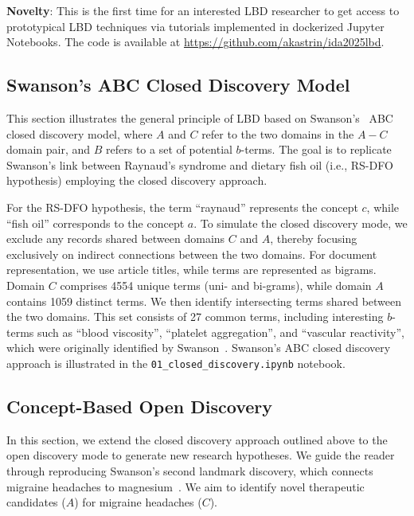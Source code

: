 \documentclass[runningheads]{llncs}
\begin{document}
\begin{tcolorbox}[breakable,notitle,sharp corners,boxrule=0.5pt,boxsep=0pt,left=5pt,right=5pt,top=5pt,bottom=5pt,before skip=0pt,after skip=0pt]
\textbf{Novelty}: This is the first time for an interested LBD researcher to get access to prototypical LBD techniques via tutorials implemented in dockerized Jupyter Notebooks. 
The code is available at \url{https://github.com/akastrin/ida2025lbd}.
\end{tcolorbox}

\subsection{Swanson's ABC Closed Discovery Model}
\label{sec:abc_model}

This section illustrates the general principle of LBD based on Swanson's~\cite{swanson1986fish} ABC closed discovery model, where $A$ and $C$ refer to the two domains in the $A{-}C$ domain pair, and $B$ refers to a set of potential $b$-terms. The goal is to replicate Swanson's link between Raynaud's syndrome and dietary fish oil (i.e., RS-DFO hypothesis) employing the closed discovery approach. 

For the RS-DFO hypothesis, the term ``raynaud'' represents the concept $c$, while ``fish oil'' corresponds to the concept $a$. To simulate the closed discovery mode, we exclude any records shared between domains $C$ and $A$, thereby focusing exclusively on indirect connections between the two domains. For document representation, we use article titles, while terms are represented as bigrams. Domain $C$ comprises 4554 unique terms (uni- and bi-grams), while domain $A$ contains 1059 distinct terms. We then identify intersecting terms shared between the two domains. This set consists of 27 common terms, including interesting $b$-terms such as ``blood viscosity'', ``platelet aggregation'', and ``vascular reactivity'', which were originally identified by Swanson~\cite{swanson1986fish}. Swanson's ABC closed discovery approach is illustrated in the \texttt{01\_closed\_dis\-cov\-ery.ipynb} notebook.

\subsection{Concept-Based Open Discovery}
\label{sec:open_discovery}

In this section, we extend the closed discovery approach outlined above to the open discovery mode to generate new research hypotheses. We guide the reader through reproducing Swanson's second landmark discovery, which connects migraine headaches to magnesium~\cite{swanson1988migraine}.  We aim to identify novel therapeutic candidates ($A$) for migraine headaches ($C$). 
\end{document}
